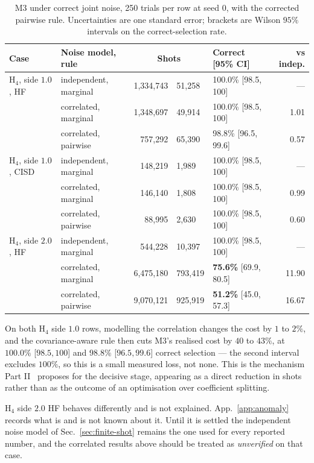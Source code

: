 \documentclass[10pt]{article}
\begin{document}
\begin{table}[!htbp]
\centering
\scriptsize
\caption{M3 under correct joint noise, 250 trials per row at seed $0$, with the corrected pairwise rule. Uncertainties are one standard error; brackets are Wilson $95\%$ intervals on the correct-selection rate.}
\label{tab:correlation}
\begin{tabular}{llr@{\,$\pm$\,}llr}
\toprule
Case & Noise model, rule & \multicolumn{2}{c}{Shots} & Correct [95\% CI] & vs indep. \\
\midrule
H$_4$, side $1.0$, HF & independent, marginal & 1,334,743 & 51,258 & 100.0\% [98.5, 100] & --- \\
 & correlated, marginal & 1,348,697 & 49,914 & 100.0\% [98.5, 100] & 1.01 \\
 & correlated, pairwise & 757,292 & 65,390 & 98.8\% [96.5, 99.6] & 0.57 \\
H$_4$, side $1.0$, CISD & independent, marginal & 148,219 & 1,989 & 100.0\% [98.5, 100] & --- \\
 & correlated, marginal & 146,140 & 1,808 & 100.0\% [98.5, 100] & 0.99 \\
 & correlated, pairwise & 88,995 & 2,630 & 100.0\% [98.5, 100] & 0.60 \\
H$_4$, side $2.0$, HF & independent, marginal & 544,228 & 10,397 & 100.0\% [98.5, 100] & --- \\
 & correlated, marginal & 6,475,180 & 793,419 & \textbf{75.6\%} [69.9, 80.5] & 11.90 \\
 & correlated, pairwise & 9,070,121 & 925,919 & \textbf{51.2\%} [45.0, 57.3] & 16.67 \\
\bottomrule
\end{tabular}
\end{table}

On both H$_4$ side $1.0$ rows, modelling the correlation changes the cost by $1$
to $2\%$, and the covariance-aware rule then cuts M3's realised cost by $40$ to
$43\%$, at $100.0\%$ [$98.5,100$] and $98.8\%$ [$96.5,99.6$] correct selection ---
the second interval excludes $100\%$, so this is a small measured loss, not none.
This is the mechanism Part II~\cite{PartII} proposes for the decisive stage,
appearing as a direct reduction in shots rather than as the outcome of an
optimisation over coefficient splitting.

H$_4$ side $2.0$ HF behaves differently and is not explained.
App.~\ref{app:anomaly} records what is and is not known about it. Until it is
settled the independent noise model of Sec.~\ref{sec:finite-shot} remains the one
used for every reported number, and the correlated results above should be treated
as \emph{unverified} on that case.
\end{document}
